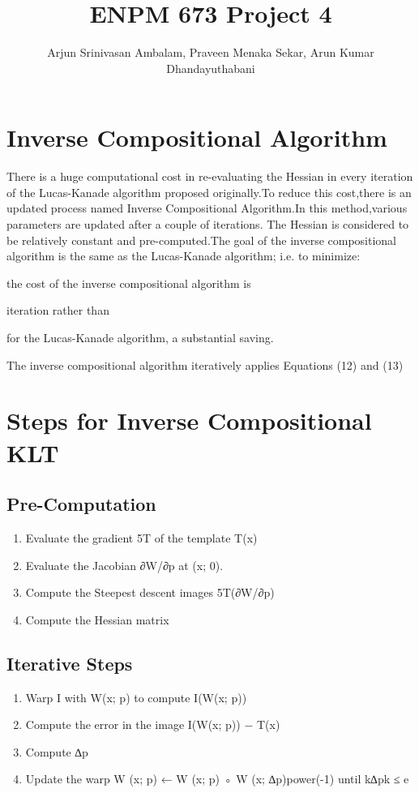 \documentclass{article}
\title{ENPM 673 Project 4}
\author{Arjun Srinivasan Ambalam, Praveen Menaka Sekar, Arun Kumar Dhandayuthabani}
\begin{document}
\maketitle

\section{Inverse Compositional Algorithm}
There is a huge computational cost in re-evaluating the Hessian in every iteration of the Lucas-Kanade algorithm proposed originally.To reduce this cost,there is an updated process named Inverse Compositional Algorithm.In this method,various  parameters are updated after a couple of iterations. The Hessian is considered to be relatively constant and pre-computed.The goal of the inverse compositional algorithm is the same as the Lucas-Kanade algorithm; i.e. to minimize:

 the cost of the inverse compositional algorithm is

 iteration rather than

for the Lucas-Kanade algorithm, a substantial saving.

The inverse compositional algorithm iteratively applies Equations (12) and (13)


\section{Steps for Inverse Compositional KLT}

\subsection{Pre-Computation}
\begin{enumerate}
    \item Evaluate the gradient 5T of the template T(x)
    \item Evaluate the Jacobian ∂W/∂p at (x; 0).
    \item Compute the Steepest descent images 5T(∂W/∂p)
    \item Compute the Hessian matrix
\end{enumerate}
\subsection{Iterative Steps}
\begin{enumerate}
    \item  Warp I with W(x; p) to compute I(W(x; p))
    \item  Compute the error in the image I(W(x; p)) − T(x)
    \item  Compute ∆p
    \item Update the warp W (x; p) ← W (x; p) ◦ W (x; ∆p)power(-1) until k∆pk ≤ e
\end{enumerate}
\end{document}
